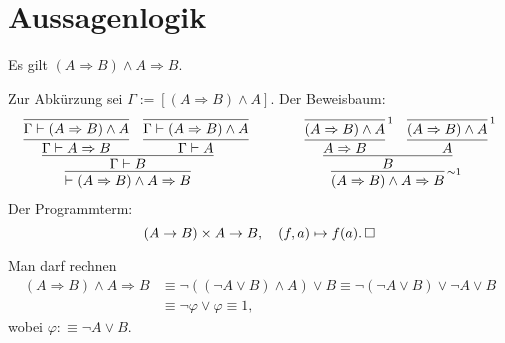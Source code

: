 \newpage
\section{Aussagenlogik}

\begin{Satz}%
\newlinefirst
Es gilt $(A\Rightarrow B)\land A \Rightarrow B$.
\end{Satz}
\begin{Beweis}[Beweis 1]
Zur Abkürzung sei $\Gamma:=[(A\Rightarrow B)\land A]$. Der Beweisbaum:
\[
\begin{array}{l@{\qquad\qquad}l}
\infer{\vdash (A\Rightarrow B)\land A\Rightarrow B}{
  \infer{\Gamma\vdash B}{
    \infer{\Gamma\vdash A\Rightarrow B}{
      \infer{\Gamma\vdash (A\Rightarrow B)\land A}{}}
  & \infer{\Gamma\vdash A}{
      \infer{\Gamma\vdash (A\Rightarrow B)\land A}{}}}}
&
\infer[\infernote{$\sim$1}]{(A\Rightarrow B)\land A\Rightarrow B}{
  \infer{B}{
    \infer{A\Rightarrow B}{
      \infer[\infernote{1}]{(A\Rightarrow B)\land A}{}}
  & \infer{A}{
      \infer[\infernote{1}]{(A\Rightarrow B)\land A}{}}}}
\end{array}
\]
Der Programmterm:
\[(A\to B)\times A\to B,\quad (f, a)\mapsto f(a).\,\square\]
\end{Beweis}

\begin{Beweis}
Man darf rechnen
\begin{align*}
(A\Rightarrow B)\land A \Rightarrow B &\equiv
\neg ((\neg A\lor B)\land A) \lor B
\equiv\neg (\neg A\lor B) \lor \neg A \lor B\\
&\equiv \neg\varphi\lor\varphi\equiv 1,
\end{align*}
wobei $\varphi :\equiv \neg A\lor B$.\;\qedsymbol
\end{Beweis}


